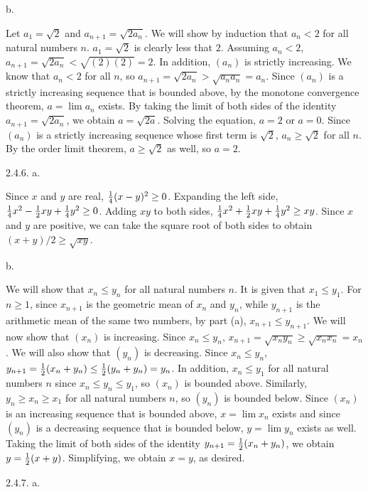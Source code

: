 \item{} b.

Let $a_1 = \sqrt 2$ and $a_{n + 1} = \sqrt {2a_n}$.
We will show by induction that $a_n < 2$ for all natural numbers $n$.
$a_1 = \sqrt 2$ is clearly less that $2$.
Assuming $a_n < 2$, $a_{n + 1} = \sqrt {2a_n} < \sqrt {(2)(2)} = 2$.
In addition, $(a_n)$ is strictly increasing.
We know that $a_n < 2$ for all $n$, so
$a_{n + 1} = \sqrt {2a_n} > \sqrt {a_n a_n} = a_n$.
Since $(a_n)$ is a strictly increasing sequence that is bounded above,
by the monotone convergence theorem, $a = \lim a_n$ exists.
By taking the limit of both sides of the identity
$a_{n + 1} = \sqrt {2a_n}$, we obtain $a = \sqrt {2a}$.
Solving the equation, $a = 2$ or $a = 0$.
Since $(a_n)$ is a strictly increasing sequence whose first term is $\sqrt 2$,
$a_n \ge \sqrt 2$ for all $n$.
By the order limit theorem, $a \ge \sqrt 2$ as well, so $a = 2$.
\bigskip
\item{2.4.6.} a.

Since $x$ and $y$ are real, ${1 \over 4} (x - y)^2 \ge 0$.
Expanding the left side, ${1 \over 4} x^2 - {1 \over 2} xy + {1 \over 4} y^2 \ge 0$.
Adding $xy$ to both sides, ${1 \over 4} x^2 + {1 \over 2} xy + {1 \over 4} y^2 \ge xy$.
Since $x$ and $y$ are positive, we can take the square root of both sides to obtain
$(x + y) / 2 \ge \sqrt {xy}$.
\medskip
\item{} b.

We will show that $x_n \le y_n$ for all natural numbers $n$.
It is given that $x_1 \le y_1$.
For $n \ge 1$, since $x_{n + 1}$ is the geometric mean of $x_n$ and $y_n$,
while $y_{n + 1}$ is the arithmetic mean of the same two numbers,
by part (a), $x_{n + 1} \le y_{n + 1}$.
We will now show that $(x_n)$ is increasing.
Since $x_n \le y_n$, $x_{n + 1} = \sqrt {x_n y_n} \ge \sqrt {x_n x_n} = x_n$.
We will also show that $(y_n)$ is decreasing.
Since $x_n \le y_n$, $y_{n + 1} = {1 \over 2} (x_n + y_n) \le {1 \over 2} (y_n + y_n) = y_n$.
In addition, $x_n \le y_1$ for all natural numbers $n$
since $x_n \le y_n \le y_1$, so $(x_n)$ is bounded above.
Similarly, $y_n \ge x_n \ge x_1$ for all natural numbers $n$,
so $(y_n)$ is bounded below.
Since $(x_n)$ is an increasing sequence that is bounded above,
$x = \lim x_n$ exists and since $(y_n)$ is a decreasing sequence
that is bounded below, $y = \lim y_n$ exists as well.
Taking the limit of both sides of the identity $y_{n + 1} = {1 \over 2} (x_n + y_n)$,
we obtain $y = {1 \over 2} (x + y)$.
Simplifying, we obtain $x = y$, as desired.
\bigskip
\item{2.4.7.} a.

